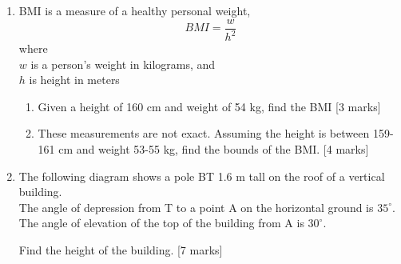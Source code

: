 \documentclass[12pt, twoside]{article}
\begin{document}
\begin{enumerate}
\newpage

  \item BMI is a measure of a healthy personal weight, 
  \[\displaystyle BMI = \frac{w}{h^2}\]
    where \\
    $w$ is a person's weight in kilograms, and \\
    $h$ is height in meters
    \begin{enumerate} 
        \item Given a height of 160 cm and weight of 54 kg, find the BMI  \hfill [3 marks]
        \item These measurements are not exact. Assuming the height is between 159-161 cm and weight 53-55 kg, find the bounds of the BMI.  \hfill [4 marks]
      \end{enumerate}

      \item The following diagram shows a pole BT 1.6 m tall on the roof of a vertical building. \\[0.25cm]
      The angle of depression from T to a point A on the horizontal ground is  
      $35^\circ$. \\[0.25cm]
      The angle of elevation of the top of the building from A is  
      $30^\circ$. 
        \begin{center}
          \end{center}
          Find the height of the building.  \hfill [7 marks]


\end{enumerate}
\end{document}
